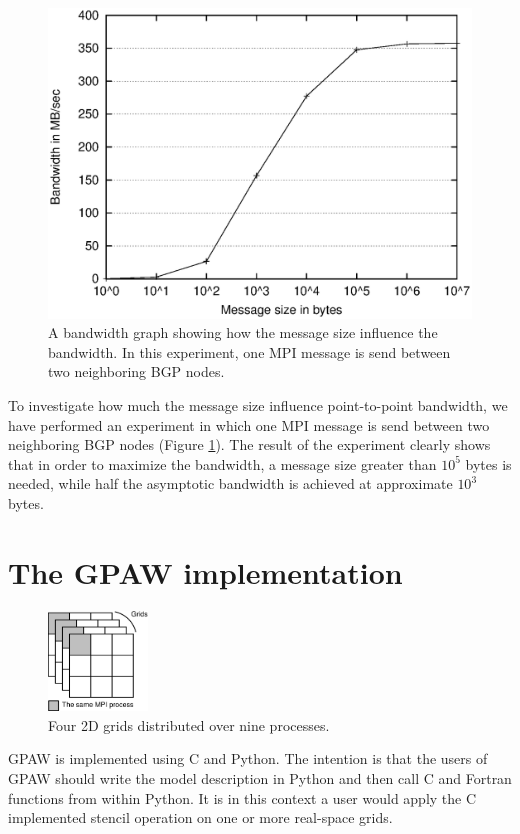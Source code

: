 \documentclass[preprint,3p,times,twocolumn]{elsarticle}
\begin{document}
\begin{figure}
 \centering
 \includegraphics[width=\linewidth]{gfx/bgp_batchsize}
 \caption{A bandwidth graph showing how the message size influence the bandwidth. In this experiment, one MPI message is send between two neighboring BGP nodes.}
 \label{fig:batchsize}
\end{figure}

To investigate how much the message size influence point-to-point bandwidth, we have performed an experiment in which one MPI message is send between two neighboring BGP nodes (Figure \ref{fig:batchsize}). The result of the experiment clearly shows that in order to maximize the bandwidth, a message size greater than $10^5$ bytes is needed, while half the asymptotic bandwidth is achieved at approximate $10^3$ bytes.


\section{The GPAW implementation}\label{section:GPAW_impl}
\begin{figure}
 \centering
 \includegraphics[width=100px]{gfx/wavedist}
 \caption{Four 2D grids distributed over nine processes.}
 \label{fig:wavedist}
\end{figure}

GPAW is implemented using C and Python. The intention is that the users of GPAW should write the model description in Python and then call C and Fortran functions from within Python. It is in this context a user would apply the C implemented stencil operation on one or more real-space grids.
\end{document}
